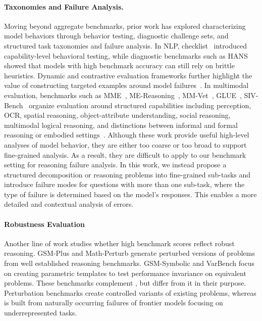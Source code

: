 \paragraph{Taxonomies and Failure Analysis.}
Moving beyond aggregate benchmarks, prior work has explored characterizing model behaviors through behavior testing, diagnostic challenge sets, and structured task taxonomies and failure analysis. In NLP, checklist~\cite{ribeiro2020beyond} introduced capability-level behavioral testing, while diagnostic benchmarks such as HANS~\cite{mccoy2019right} showed that models with high benchmark accuracy can still rely on brittle heuristics. Dynamic and contrastive evaluation frameworks further highlight the value of constructing targeted examples around model failures~\cite{kiela2021dynabench,gardner2020evaluating}. In multimodal evaluation, benchmarks such as MME~\cite{fu2023mme0}, ME-Reasoning~\cite{mme_reasoning_2025}, MM-Vet~\cite{yu2023mm}, GLUE~\cite{wang2018glue}, SIV-Bench~\cite{kong2025siv} organize evaluation around structured capabilities including perception, OCR, spatial reasoning, object-attribute understanding, social reasoning, multimodal logical reasoning, and distinctions between informal and formal reasoning or embodied settings~\cite{reasoning_failure_survey_2025}. Although these work provide useful high-level analyses of model behavior, they are either too coarse or too broad to support fine-grained analysis. As a result, they are difficult to apply to our benchmark setting for reasoning failure analysis. In this work, we instead propose a structured decomposition or reasoning problems into fine-grained sub-tasks and introduce failure modes for questions with more than one sub-task, where the type of failure is determined based on the model’s responses. This enables a more detailed and contextual analysis of errors.


\paragraph{Robustness Evaluation}
Another line of work studies whether high benchmark scores reflect robust reasoning. GSM-Plus \cite{li2024gsmplus} and Math-Perturb \cite{MATHPerturb2025} generate perturbed versions of problems from well established reasoning benchmarks. GSM-Symbolic \cite{Mirzadehetal2025} and VarBench \cite{qian2024varbench} focus on creating parametric templates to test performance invariance on equivalent problems.
These benchmarks complement \bench, but differ from it in their purpose. Perturbation benchmarks create controlled variants of existing problems, whereas \bench is built from naturally occurring failures of frontier models focusing on underrepresented tasks.




